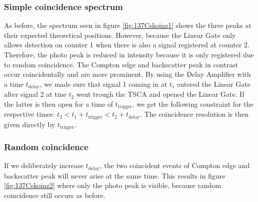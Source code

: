 \subsubsection{Simple coincidence spectrum}
%
As before, the spectrum seen in figure \ref{fig:137Cskoinz1} shows the three peaks at their expected theoretical positions.
However, because the Linear Gate only allows detection on counter 1 when there is also a signal registered at counter 2.
Therefore, the photo peak is reduced in intensity because it is only registered due to random coincidence.
The Compton edge and backscatter peak in contrast occur coincidentally and are more prominent.
By using the Delay Amplifier with a time $t_{\text{delay}}$, we made sure that signal 1 coming in at $t_1$ entered the Linear Gate after signal 2 at tine $t_2$ went trough the TSCA and opened the Linear Gate.
If the latter is then open for a time of $t_{\text{trigger}}$, we get the following constraint for the respective times: $t_2 < t_1 + t_{\text{trigger}} < t_2 +  t_{\text{delay}}$.
The coincidence resolution is then given directly by $t_{\text{trigger}}$.
%
\subsubsection{Random coincidence}
%
If we deliberately increase $t_{\text{delay}}$, the two coincident events of Compton edge and backscatter peak will never arise at the same time.
This results in figure \ref{fig:137Cskoinz2} where only the photo peak is visible, because random coincidence still occurs as before.
%
